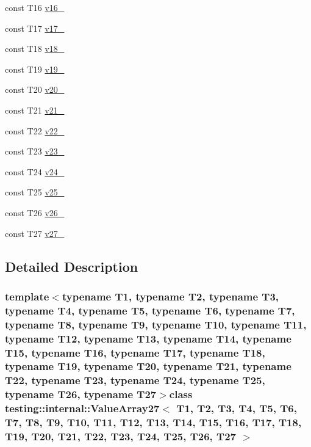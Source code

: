 \begin{DoxyCompactItemize}
\item 
const \-T16 \hyperlink{classtesting_1_1internal_1_1ValueArray27_a8b2b80d31925c1583c3e694d2bf235c5}{v16\-\_\-}
\item 
const \-T17 \hyperlink{classtesting_1_1internal_1_1ValueArray27_a9f59ea9e6f3642f77227dd1f7882d649}{v17\-\_\-}
\item 
const \-T18 \hyperlink{classtesting_1_1internal_1_1ValueArray27_ad07972ee98135c8deb090fc891a04e3e}{v18\-\_\-}
\item 
const \-T19 \hyperlink{classtesting_1_1internal_1_1ValueArray27_a3ad77b5b43c14332dabc9d47c8907e7f}{v19\-\_\-}
\item 
const \-T20 \hyperlink{classtesting_1_1internal_1_1ValueArray27_adb43992f7b5f5f07e0187003b8c9c872}{v20\-\_\-}
\item 
const \-T21 \hyperlink{classtesting_1_1internal_1_1ValueArray27_a80089b2eaa99efb5d3559378fbdac426}{v21\-\_\-}
\item 
const \-T22 \hyperlink{classtesting_1_1internal_1_1ValueArray27_aeec4c711a4f7cf166e6a2646aa7d0bc7}{v22\-\_\-}
\item 
const \-T23 \hyperlink{classtesting_1_1internal_1_1ValueArray27_a7f672a4a694f749a8b6119bff7705a66}{v23\-\_\-}
\item 
const \-T24 \hyperlink{classtesting_1_1internal_1_1ValueArray27_a6c10a180ac97815f7d3f4522507e91ca}{v24\-\_\-}
\item 
const \-T25 \hyperlink{classtesting_1_1internal_1_1ValueArray27_a26cfe8143447970e30441924be04bf08}{v25\-\_\-}
\item 
const \-T26 \hyperlink{classtesting_1_1internal_1_1ValueArray27_a26c3ac1aaf85c25e014a5001cfecb4c5}{v26\-\_\-}
\item 
const \-T27 \hyperlink{classtesting_1_1internal_1_1ValueArray27_aee0cd82b89da8c22b3d49e9beea5f0a4}{v27\-\_\-}
\end{DoxyCompactItemize}


\subsection{\-Detailed \-Description}
\subsubsection*{template$<$typename T1, typename T2, typename T3, typename T4, typename T5, typename T6, typename T7, typename T8, typename T9, typename T10, typename T11, typename T12, typename T13, typename T14, typename T15, typename T16, typename T17, typename T18, typename T19, typename T20, typename T21, typename T22, typename T23, typename T24, typename T25, typename T26, typename T27$>$class testing\-::internal\-::\-Value\-Array27$<$ T1, T2, T3, T4, T5, T6, T7, T8, T9, T10, T11, T12, T13, T14, T15, T16, T17, T18, T19, T20, T21, T22, T23, T24, T25, T26, T27 $>$}



